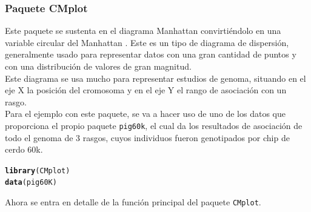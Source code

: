 \documentclass{article}\usepackage[]{graphicx}\usepackage[]{color}
\makeatletter
\newcommand{\hlstd}[1]{\textcolor[rgb]{0.345,0.345,0.345}{#1}}%
\newcommand{\hlkwd}[1]{\textcolor[rgb]{0.737,0.353,0.396}{\textbf{#1}}}%
\newenvironment{kframe}{%
 \def\at@end@of@kframe{}%
 \ifinner\ifhmode%
  \def\at@end@of@kframe{\end{minipage}}%
  \begin{minipage}{\columnwidth}%
 \fi\fi%
 \def\FrameCommand##1{\hskip\@totalleftmargin \hskip-\fboxsep
 \colorbox{shadecolor}{##1}\hskip-\fboxsep
     \hskip-\linewidth \hskip-\@totalleftmargin \hskip\columnwidth}%
 \MakeFramed {\advance\hsize-\width
   \@totalleftmargin\z@ \linewidth\hsize
   \@setminipage}}%
 {\par\unskip\endMakeFramed%
 \at@end@of@kframe}
\newenvironment{knitrout}{}{} %
\makeatother
\begin{document}
\subsubsection{Paquete CMplot}
Este paquete se sustenta en el diagrama Manhattan convirti\'endolo en una variable circular del Manhattan%
. Este es un tipo de diagrama de dispersi\'on, generalmente usado para representar datos con una gran cantidad de puntos y con una distribuci\'on de valores de gran magnitud.~\\
Este diagrama se usa mucho para representar estudios de genoma, situando en el eje X la posici\'on del cromosoma y en el eje Y el rango de asociaci\'on con un rasgo.~\\
Para el ejemplo con este paquete, se va a hacer uso de uno de los datos que proporciona el propio paquete \texttt{pig60k}, el cual da los resultados de asociaci\'on de todo el genoma de 3 rasgos, cuyos individuos fueron genotipados por chip de cerdo 60k.
\begin{knitrout}
\color{fgcolor}\begin{kframe}
\begin{alltt}
\hlkwd{library}\hlstd{(CMplot)}
\hlkwd{data}\hlstd{(pig60K)}
\end{alltt}
\end{kframe}
\end{knitrout}
\clearpage
Ahora se entra en detalle de la funci\'on principal del paquete \texttt{CMplot}.
\end{document}
